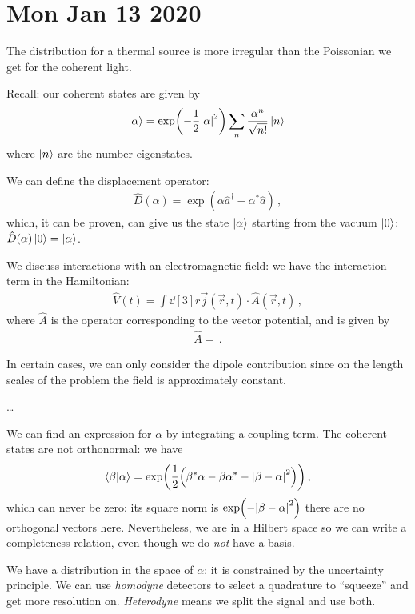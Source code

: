 \documentclass[main.tex]{subfiles}
\begin{document}
\section*{Mon Jan 13 2020}

The distribution for a thermal source is more irregular than the Poissonian we get for the coherent light. 

Recall: our coherent states are given by 
%
\begin{align}
\ket{\alpha } = \exp(- \frac{1}{2} \abs{\alpha}^2) \sum _{n} \frac{\alpha^{n}}{\sqrt{n!}} \ket{n}
\,
\end{align}
%
where \(\ket{n}\) are the number eigenstates. 

We can define the displacement operator: 
%
\begin{align}
\hat{D} (\alpha ) = \exp( \alpha \hat{a}^\dag - \alpha^{*} \hat{a})
\,,
\end{align}
%
which, it can be proven, can give us the state \(\ket{\alpha }\) starting from the vacuum \(\ket{0}\): \(\hat{D} (\alpha ) \ket{0} = \ket{\alpha }\). 

We discuss interactions with an electromagnetic field: we have the interaction term in the Hamiltonian: 
%
\begin{align}
\hat{V}(t) = \int \dd[3]{r} \vec{j} (\vec{r},t) \cdot \hat{A} (\vec{r}, t)
\,,
\end{align}
%
where \(\hat{A}\) is the operator corresponding to the vector potential, and is given by 
%
\begin{align}
\hat{A} = 
\,.
\end{align}

In certain cases, we can only consider the dipole contribution since on the length scales of the problem the field is approximately constant. 

\dots

We can find an expression for \(\alpha \) by integrating a coupling term. 
The coherent states are not orthonormal: we have 
%
\begin{align}
\braket{\beta }{\alpha } = \exp( \frac{1}{2} \qty(\beta ^{*} \alpha - \beta \alpha^{*} -\abs{\beta -\alpha }^2 ))
\,,
\end{align}
%
which can never be zero: its square norm is \(\exp(-\abs{\beta- \alpha }^2)\) there are no orthogonal vectors here. Nevertheless, we are in a Hilbert space so we can write a completeness relation, even though we do \emph{not} have a basis. 

We have a distribution in the space of \(\alpha \): it is constrained by the uncertainty principle. We can use \emph{homodyne} detectors to select a quadrature to ``squeeze'' and get more resolution on. \emph{Heterodyne} means we split the signal and use both. 
\end{document}
